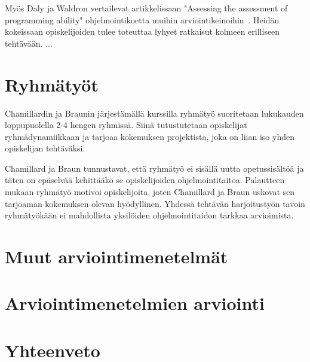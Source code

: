 \documentclass[finnish]{../tktltiki2}
\theoremstyle{definition}
\theoremstyle{remark}
\begin{document}
Myös Daly ja Waldron vertailevat artikkelissaan "Assessing the assessment of programming ability" ohjelmointikoetta muihin arviointikeinoihin~\cite{DW04}. Heidän kokeissaan opiskelijoiden tulee toteuttaa lyhyet ratkaisut kolmeen erilliseen tehtävään. ...


\section{Ryhmätyöt}
Chamillardin ja Braunin järjestämällä kurssilla ryhmätyö suoritetaan lukukauden loppupuolella 2-4 hengen ryhmissä. Siinä tutustutetaan opiskelijat ryhmädynamiikkaan ja tarjoaa kokemuksen projektista, joka on liian iso yhden opiskelijan tehtäväksi.

Chamillard ja Braun tunnustavat, että ryhmätyö ei sisällä uutta opetussisältöä ja täten on epäselvää kehittääkö se opiskelijoiden ohjelmointitaitoa. Palautteen mukaan ryhmätyö motivoi opiskelijoita, joten Chamillard ja Braun uskovat sen tarjoaman kokemuksen olevan hyödyllinen. Yhdessä tehtävän harjoitustyön tavoin ryhmätyökään ei mahdollista yksilöiden ohjelmointitaidon tarkkaa arvioimista.

\section{Muut arviointimenetelmät}


\section{Arviointimenetelmien arviointi}


\section{Yhteenveto}






\end{document}
